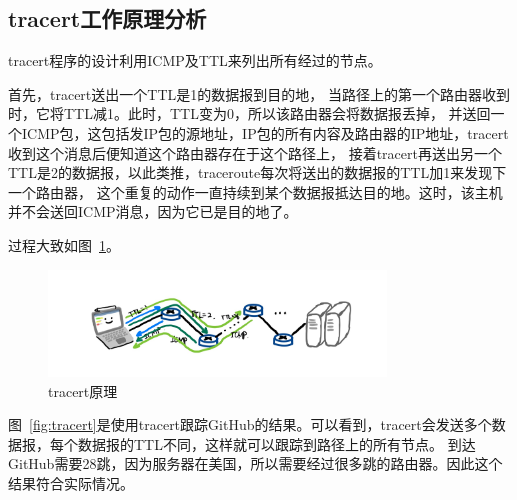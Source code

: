 \documentclass[a4paper,twoside]{article}
\begin{document}
\begin{spacing}{1.2}
\subsection{tracert工作原理分析}

tracert程序的设计利用ICMP及TTL来列出所有经过的节点。

首先，tracert送出一个TTL是1的数据报到目的地，
当路径上的第一个路由器收到时，它将TTL减1。此时，TTL变为0，所以该路由器会将数据报丢掉，
并送回一个ICMP包，这包括发IP包的源地址，IP包的所有内容及路由器的IP地址，tracert收到这个消息后便知道这个路由器存在于这个路径上，
接着tracert再送出另一个TTL是2的数据报，以此类推，traceroute每次将送出的数据报的TTL加1来发现下一个路由器，
这个重复的动作一直持续到某个数据报抵达目的地。这时，该主机并不会送回ICMP消息，因为它已是目的地了。

过程大致如图~\ref{fig:tracert_ill}。

\begin{figure}[htb]
	\centering
	\caption{tracert原理}
	\label{fig:tracert_ill}
	\includegraphics[width=0.8\textwidth]{tracert_method.png}
\end{figure}


图~\ref{fig:tracert}是使用tracert跟踪GitHub的结果。可以看到，tracert会发送多个数据报，每个数据报的TTL不同，这样就可以跟踪到路径上的所有节点。
到达GitHub需要28跳，因为服务器在美国，所以需要经过很多跳的路由器。因此这个结果符合实际情况。


\end{spacing}
\end{document}
